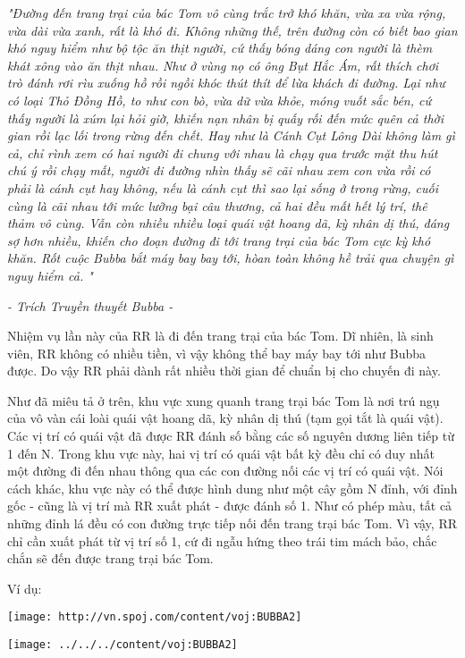 

\emph{"Đường đến trang trại của bác Tom vô cùng trắc trở khó khăn, vừa xa vừa rộng, vừa dài vừa xanh, rất là khó đi. Không những thế, trên đường còn có biết bao gian khó nguy hiểm như bộ tộc ăn thịt người, cứ thấy bóng dáng con người là thèm khát xông vào ăn thịt nhau. Như ở vùng nọ có ông Bụt Hắc Ám, rất thích chơi trò đánh rơi rìu xuống hồ rồi ngồi khóc thút thít để lừa khách đi đường. Lại như có loại Thỏ Đồng Hồ, to như con bò, vừa dữ vừa khỏe, móng vuốt sắc bén, cứ thấy người là xúm lại hỏi giờ, khiến nạn nhân bị quấy rối đến mức quên cả thời gian rồi lạc lối trong rừng đến chết. Hay như là Cánh Cụt Lông Dài không làm gì cả, chỉ rình xem có hai người đi chung với nhau là chạy qua trước mặt thu hút chú ý rồi chạy mất, người đi đường nhìn thấy sẽ cãi nhau xem con vừa rồi có phải là cánh cụt hay không, nếu là cánh cụt thì sao lại sống ở trong rừng, cuối cùng là cãi nhau tới mức lưỡng bại câu thương, cả hai đều mất hết lý trí, thê thảm vô cùng. Vẫn còn nhiều nhiều loại quái vật hoang dã, kỳ nhân dị thú, đáng sợ hơn nhiều, khiến cho đoạn đường đi tới trang trại của bác Tom cực kỳ khó khăn. Rốt cuộc Bubba bắt máy bay bay tới, hòan toàn không hề trải qua chuyện gì nguy hiểm cả. " }

\emph{- Trích Truyền thuyết Bubba - }

Nhiệm vụ lần này của RR là đi đến trang trại của bác Tom. Dĩ nhiên, là sinh viên, RR không có nhiều tiền, vì vậy không thể bay máy bay tới như Bubba được. Do vậy RR phải dành rất nhiều thời gian để chuẩn bị cho chuyến đi này.

Như đã miêu tả ở trên, khu vực xung quanh trang trại bác Tom là nơi trú ngụ của vô vàn cái loài quái vật hoang dã, kỳ nhân dị thú (tạm gọi tắt là quái vật). Các vị trí có quái vật đã được RR đánh số bằng các số nguyên dương liên tiếp từ 1 đến N. Trong khu vực này, hai vị trí có quái vật bất kỳ đều chỉ có duy nhất một đường đi đến nhau thông qua các con đường nối các vị trí có quái vật. Nói cách khác, khu vực này có thể được hình dung như một cây gồm N đỉnh, với đỉnh gốc - cũng là vị trí mà RR xuất phát - được đánh số 1. Như có phép màu, tất cả những đỉnh lá đều có con đường trực tiếp nối đến trang trại bác Tom. Vì vậy, RR chỉ cần xuất phát từ vị trí số 1, cứ đi ngẫu hứng theo trái tim mách bảo, chắc chắn sẽ đến được trang trại bác Tom.

Ví dụ:


\texttt{[image: http://vn.spoj.com/content/voj:BUBBA2]}


\texttt{[image: ../../../content/voj:BUBBA2]}


